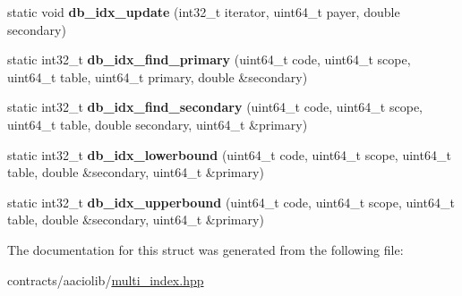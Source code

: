 \begin{DoxyCompactItemize}
\item 
\mbox{\label{structaacio_1_1secondary__index__db__functions_3_01double_01_4_aa569ec96ff658799765ce68bbcbe3b16}} 
static void {\bfseries db\+\_\+idx\+\_\+update} (int32\+\_\+t iterator, uint64\+\_\+t payer, double secondary)
\item 
\mbox{\label{structaacio_1_1secondary__index__db__functions_3_01double_01_4_a0e7f01f81c61876fcaee08e5f2ef497a}} 
static int32\+\_\+t {\bfseries db\+\_\+idx\+\_\+find\+\_\+primary} (uint64\+\_\+t code, uint64\+\_\+t scope, uint64\+\_\+t table, uint64\+\_\+t primary, double \&secondary)
\item 
\mbox{\label{structaacio_1_1secondary__index__db__functions_3_01double_01_4_a215633f6d418e61ca6bc782e418abc2f}} 
static int32\+\_\+t {\bfseries db\+\_\+idx\+\_\+find\+\_\+secondary} (uint64\+\_\+t code, uint64\+\_\+t scope, uint64\+\_\+t table, double secondary, uint64\+\_\+t \&primary)
\item 
\mbox{\label{structaacio_1_1secondary__index__db__functions_3_01double_01_4_a4ad54862cbc3773dff80e1896b84244a}} 
static int32\+\_\+t {\bfseries db\+\_\+idx\+\_\+lowerbound} (uint64\+\_\+t code, uint64\+\_\+t scope, uint64\+\_\+t table, double \&secondary, uint64\+\_\+t \&primary)
\item 
\mbox{\label{structaacio_1_1secondary__index__db__functions_3_01double_01_4_a3aa02a248445c588c520d79c086b25a7}} 
static int32\+\_\+t {\bfseries db\+\_\+idx\+\_\+upperbound} (uint64\+\_\+t code, uint64\+\_\+t scope, uint64\+\_\+t table, double \&secondary, uint64\+\_\+t \&primary)
\end{DoxyCompactItemize}


The documentation for this struct was generated from the following file\+:\begin{DoxyCompactItemize}
\item 
contracts/aaciolib/\mbox{\hyperlink{multi__index_8hpp}{multi\+\_\+index.\+hpp}}\end{DoxyCompactItemize}
